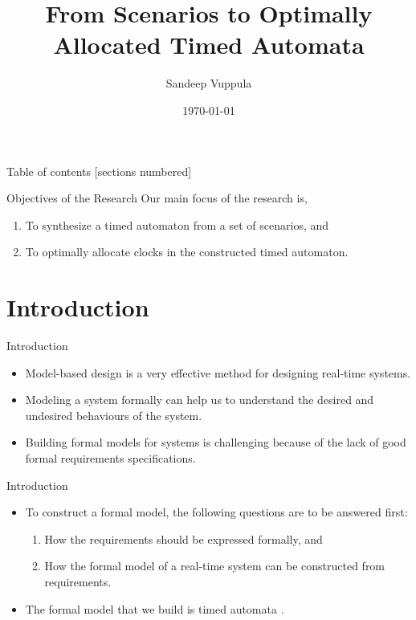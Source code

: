 \documentclass[10pt]{beamer}
\title{From Scenarios to Optimally Allocated Timed Automata}
\date{\today}
\author{Sandeep Vuppula}
\institute{University of Minnesota Duluth}
\theoremstyle{plain}
\theoremstyle{definition}
\begin{document}
\maketitle

\begin{frame}{Table of contents}
  [sections numbered]
  \tableofcontents[hideallsubsections]
\end{frame}

\begin{frame}{Objectives of the Research}
	Our main focus of the research is,
	\begin{enumerate}
		\item	To synthesize a timed automaton from a set of scenarios, and
		\item	To optimally allocate clocks in the constructed timed automaton.
	\end{enumerate}
\end{frame}

\section{Introduction}

\begin{frame}{Introduction}
	\begin{itemize}
		\item Model-based design is a very effective method for designing real-time systems.
		\item Modeling a system formally can help us to understand the desired and undesired behaviours of the system.
		\item Building formal models for systems is challenging because of the lack of good formal requirements specifications.
	\end{itemize}	
\end{frame}

\begin{frame}{Introduction}
	\begin{itemize}
		\item	{To construct a formal model, the following questions are to be answered first:
					\begin{enumerate}
						\item How the requirements should be expressed formally, and
						\item How the formal model of a real-time system can be constructed from requirements.
					\end{enumerate}
				}
		\item {The formal model that we build is \alert{timed automata} \cite{Alur:1994:TTA:180782.180519}.}
\end{itemize}
\end{frame}
\end{document}
